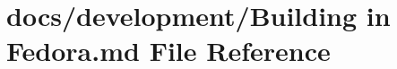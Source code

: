\hypertarget{Building_01in_01Fedora_8md}{\section{docs/development/\+Building in Fedora.\+md File Reference}
\label{Building_01in_01Fedora_8md}
}
